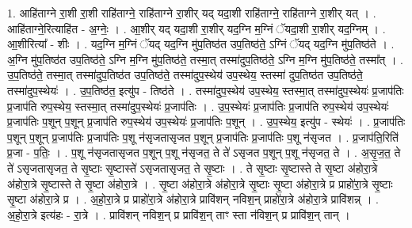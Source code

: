 \documentclass[17pt]{extarticle}
\begin{document}
1. आहि॑ताग्ने रा॒शी रा॒शी राहि॑ताग्ने॒ राहि॑ताग्ने रा॒शीर् यद् यदा॒शी राहि॑ताग्ने॒ राहि॑ताग्ने रा॒शीर् यत् । . आहि॑ताग्ने॒रित्याहि॑त - अ॒ग्नेः॒ । . आ॒शीर् यद् यदा॒शी रा॒शीर् यद॒ग्नि म॒ग्निं ॅयदा॒शी रा॒शीर् यद॒ग्निम् । . आ॒शीरित्या᳚ - शीः । . यद॒ग्नि म॒ग्निं ॅयद् यद॒ग्नि मु॑प॒तिष्ठ॑त उप॒तिष्ठ॑ते॒ ऽग्निं ॅयद् यद॒ग्नि मु॑प॒तिष्ठ॑ते । . अ॒ग्नि मु॑प॒तिष्ठ॑त उप॒तिष्ठ॑ते॒ ऽग्नि म॒ग्नि मु॑प॒तिष्ठ॑ते॒ तस्मा॒त् तस्मा॑दुप॒तिष्ठ॑ते॒ ऽग्नि म॒ग्नि मु॑प॒तिष्ठ॑ते॒ तस्मा᳚त् । . उ॒प॒तिष्ठ॑ते॒ तस्मा॒त् तस्मा॑दुप॒तिष्ठ॑त उप॒तिष्ठ॑ते॒ तस्मा॑दुप॒स्थेय॑ उप॒स्थेय॒ स्तस्मा॑ दुप॒तिष्ठ॑त उप॒तिष्ठ॑ते॒ तस्मा॑दुप॒स्थेयः॑ । . उ॒प॒तिष्ठ॑त॒ इत्यु॑प - तिष्ठ॑ते । . तस्मा॑दुप॒स्थेय॑ उप॒स्थेय॒ स्तस्मा॒त् तस्मा॑दुप॒स्थेयः॑ प्र॒जाप॑तिः प्र॒जाप॑ति रुप॒स्थेय॒ स्तस्मा॒त् तस्मा॑दुप॒स्थेयः॑ प्र॒जाप॑तिः । . उ॒प॒स्थेयः॑ प्र॒जाप॑तिः प्र॒जाप॑ति रुप॒स्थेय॑ उप॒स्थेयः॑ प्र॒जाप॑तिः प॒शून् प॒शून् प्र॒जाप॑ति रुप॒स्थेय॑ उप॒स्थेयः॑ प्र॒जाप॑तिः प॒शून् । . उ॒प॒स्थेय॒ इत्यु॑प - स्थेयः॑ । . प्र॒जाप॑तिः प॒शून् प॒शून् प्र॒जाप॑तिः प्र॒जाप॑तिः प॒शू न॑सृजतासृजत प॒शून् प्र॒जाप॑तिः प्र॒जाप॑तिः प॒शू न॑सृजत । . प्र॒जाप॑ति॒रिति॑ प्र॒जा - प॒तिः॒ । . प॒शू न॑सृजतासृजत प॒शून् प॒शू न॑सृजत॒ ते ते॑ ऽसृजत प॒शून् प॒शू न॑सृजत॒ ते । . अ॒सृ॒ज॒त॒ ते ते॑ ऽसृजतासृजत॒ ते सृ॒ष्टाः सृ॒ष्टास्ते॑ ऽसृजतासृजत॒ ते सृ॒ष्टाः । . ते सृ॒ष्टाः सृ॒ष्टास्ते ते सृ॒ष्टा अ॑होरा॒त्रे अ॑होरा॒त्रे सृ॒ष्टास्ते ते सृ॒ष्टा अ॑होरा॒त्रे । . सृ॒ष्टा अ॑होरा॒त्रे अ॑होरा॒त्रे सृ॒ष्टाः सृ॒ष्टा अ॑होरा॒त्रे प्र प्राहो॑रा॒त्रे सृ॒ष्टाः सृ॒ष्टा अ॑होरा॒त्रे प्र । . अ॒हो॒रा॒त्रे प्र प्राहो॑रा॒त्रे अ॑होरा॒त्रे प्रावि॑शन् नविश॒न् प्राहो॑रा॒त्रे अ॑होरा॒त्रे प्रावि॑शन्न् । . अ॒हो॒रा॒त्रे इत्य॑हः - रा॒त्रे । . प्रावि॑शन् नविश॒न् प्र प्रावि॑श॒न् ताꣳ स्ता न॑विश॒न् प्र प्रावि॑श॒न् तान् । \newline
\end{document}
